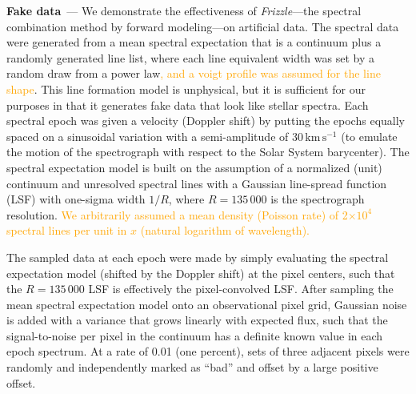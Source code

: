 \documentclass[modern, linenumbers]{aastex631}
\renewcommand{\paragraph}[1]{\medskip\par\noindent\textbf{#1}~---}
\newcommand{\name}{\textsl{Frizzle}}
\newcommand{\unit}[1]{\mathrm{#1}}
\newcommand{\kmps}{\unit{km\,s^{-1}}}
\newcommand{\modified}[1]{\textcolor{orange}{#1}}
\begin{document}
\paragraph{Fake data}
We demonstrate the effectiveness of \name{}---the spectral combination method by forward modeling---on artificial data.
The spectral data were generated from a mean spectral expectation that is a continuum plus a randomly generated line list, where each line equivalent width was set by a random draw from a power law\modified{, and a voigt profile was assumed for the line shape}.
This line formation model is unphysical, but it is sufficient for our purposes in that it generates fake data that look like stellar spectra.
Each spectral epoch was given a velocity (Doppler shift) by putting the epochs equally spaced on a sinusoidal variation with a semi-amplitude of $30\,\kmps$ (to emulate the motion of the spectrograph with respect to the Solar System barycenter).
The spectral expectation model is built on the assumption of a normalized (unit) continuum and unresolved spectral lines with a Gaussian line-spread function (LSF) with one-sigma width $1/R$, where $R=135\,000$ is the spectrograph resolution. \modified{We arbitrarily assumed a mean density (Poisson rate) of 2$\times{}10^4$ spectral lines per unit in $x$ (natural logarithm of wavelength).}


The sampled data at each epoch were made by simply evaluating the spectral expectation model (shifted by the Doppler shift) at the pixel centers, such that the $R=135\,000$ LSF is effectively the pixel-convolved LSF.
After sampling the mean spectral expectation model onto an observational pixel grid, Gaussian noise is added with a variance that grows linearly with expected flux, such that the signal-to-noise per pixel in the continuum has a definite known value in each epoch spectrum.
At a rate of 0.01 (one percent), sets of three adjacent pixels were randomly and independently marked as ``bad'' and offset by a large positive offset.
\end{document}
